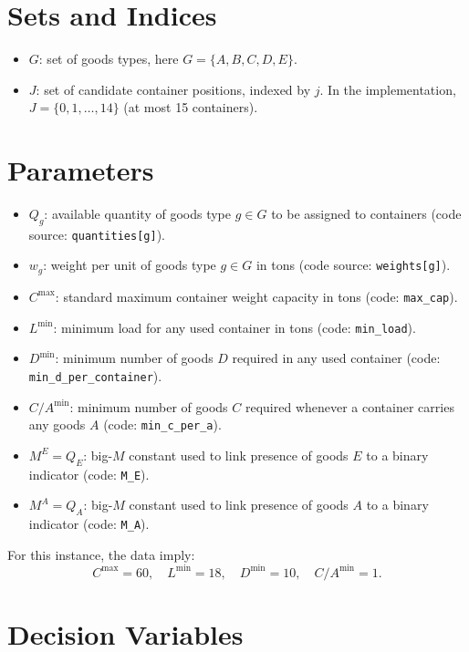 \section*{Sets and Indices}

\begin{itemize}
    \item $G$: set of goods types, here $G=\{A,B,C,D,E\}$.
    \item $J$: set of candidate container positions, indexed by $j$. In the implementation, $J=\{0,1,\dots,14\}$ (at most 15 containers).
\end{itemize}

\section*{Parameters}

\begin{itemize}
    \item $Q_g$: available quantity of goods type $g \in G$ to be assigned to containers (code source: \texttt{quantities[g]}).
    \item $w_g$: weight per unit of goods type $g \in G$ in tons (code source: \texttt{weights[g]}).
    \item $C^{\max}$: standard maximum container weight capacity in tons (code: \texttt{max\_cap}).
    \item $L^{\min}$: minimum load for any used container in tons (code: \texttt{min\_load}).
    \item $D^{\min}$: minimum number of goods $D$ required in any used container (code: \texttt{min\_d\_per\_container}).
    \item $C/A^{\min}$: minimum number of goods $C$ required whenever a container carries any goods $A$ (code: \texttt{min\_c\_per\_a}).
    \item $M^E = Q_E$: big-$M$ constant used to link presence of goods $E$ to a binary indicator (code: \texttt{M\_E}).
    \item $M^A = Q_A$: big-$M$ constant used to link presence of goods $A$ to a binary indicator (code: \texttt{M\_A}).
\end{itemize}

For this instance, the data imply:
\[
C^{\max}=60,\quad L^{\min}=18,\quad D^{\min}=10,\quad C/A^{\min}=1.
\]

\section*{Decision Variables}

